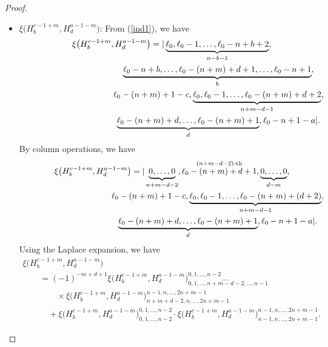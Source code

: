 \documentclass[10pt,a4paper]{amsart}
\numberwithin{equation}{section}
\begin{document}
\begin{proof}
\begin{itemize}
\item $\xi\bigl(H^{c-1+m}_{b}, H^{a-1-m}_{d}\bigr)$: From (\ref{ind1}), we have
\begin{gather*}
\xi\bigl(H^{c-1+m}_{b}, H^{a-1-m}_{d}\bigr)=|\underbrace{\ell_{0},\ell_{0}-1,\dots,\ell_{0}-n+b+2}_{n-b-1},\\
\hphantom{\xi\bigl(H^{c-1+m}_{b}, H^{a-1-m}_{d}\bigr)=|}{}
\underbrace{\ell_{0}-n+b,\dots,\ell_{0}-(n+m)+d+1,\dots,\ell_{0}-n+1}_{b},\nonumber\\
\hphantom{\xi\bigl(H^{c-1+m}_{b}, H^{a-1-m}_{d}\bigr)=|}{}
\,\ell_{0}-(n+m)+1-c,\underbrace{\ell_{0},\ell_{0}-1,\dots,\ell_{0}-(n+m)+d+2}_{n+m-d-1},\nonumber\\
\hphantom{\xi\bigl(H^{c-1+m}_{b}, H^{a-1-m}_{d}\bigr)=|}{}
\underbrace{\ell_{0}-(n+m)+d,\dots,\ell_{0}-(n+m)+1}_{d},\ell_{0}-n+1-a|.
\end{gather*}
By column operations, we have
\begin{gather*}
\xi\bigl(H^{c-1+m}_{b}, H^{a-1-m}_{d}\bigr)=|\underbrace{0,\dots,0}_{n+m-d-2},\stackrel{(n+m-d-2)\text{-th}}{\ell_{0}-(n+m)+d+1},\underbrace{0,\dots,0}_{d-m},\nonumber\\
\hphantom{\xi\bigl(H^{c-1+m}_{b}, H^{a-1-m}_{d}\bigr)=|}{}
\,\ell_{0}-(n+m)+1-c,\underbrace{\ell_{0},\ell_{0}-1,\dots,\ell_{0}-(n+m)+(d+2)}_{n+m-d-1},\nonumber\\
\hphantom{\xi\bigl(H^{c-1+m}_{b}, H^{a-1-m}_{d}\bigr)=|}{}
\underbrace{\ell_{0}-(n+m)+d,\dots,\ell_{0}-(n+m)+1}_{d},\ell_{0}-n+1-a|.
\end{gather*}
Using the Laplace expansion, we have
\begin{gather*}
\xi\bigl(H^{c-1+m}_{b}, H^{a-1-m}_{d}\bigr)\\
\qquad{}={(-1)}^{-m+d+1}\xi\bigl(H^{c-1+m}_{b}, H^{a-1-m}_{d}\bigr)^{0,1,\dots,n-2}_{0,1,\dots,\widehat{n+m-d-2},\dots,n-1}\\
\qquad\qquad{}\times
\xi\bigl(H^{c-1+m}_{b}, H^{a-1-m}_{d}\bigr)^{n-1,n,\dots,2n+m-1}_{n+m+d-2,n,\dots,2n+m-1}\\
\qquad\quad{}
+\xi\bigl(H^{c-1+m}_{b}, H^{a-1-m}_{d}\bigr)^{0,1,\dots,n-2}_{0,1,\dots,n-2}\cdot\xi\bigl(H^{c-1+m}_{b}, H^{a-1-m}_{d}\bigr)^{n-1,n,\dots,2n+m-1}_{n-1,n,\dots,2n+m-1}.
\end{gather*}



\end{itemize}
\end{proof}
\end{document}

